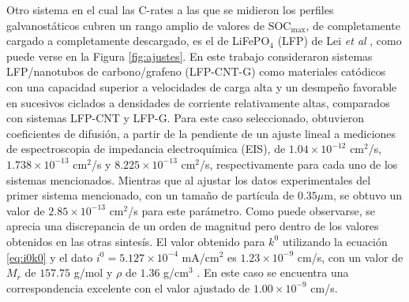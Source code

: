 Otro sistema en el cual las C-rates a las que se midieron los perfiles 
galvanostáticos cubren un rango amplio de valores de SOC$_{\max}$, de 
completamente cargado a completamente descargado, es el de LiFePO$_4$ (LFP) de 
Lei \textit{et al} \cite{lei2015}, como puede verse en la Figura 
\ref{fig:ajustes}. En este trabajo consideraron sistemas LFP/nanotubos de 
carbono/grafeno (LFP-CNT-G) como materiales catódicos con una capacidad 
superior a velocidades de carga alta y un desmpeño favorable en sucesivos 
ciclados a densidades de corriente relativamente altas, comparados con 
sistemas LFP-CNT y LFP-G. Para este caso seleccionado, obtuvieron coeficientes 
de difusión, a partir de la pendiente de un ajuste lineal a mediciones de 
espectroscopia de impedancia electroquímica (EIS), de $1.04\times10^{-12}$ 
cm$^2$/s, $1.738\times10^{-13}$ cm$^2$/s y $8.225\times10^{-13}$ cm$^2$/s, 
respectivamente para cada uno de los sistemas mencionados. Mientras que al
ajustar los datos experimentales del primer sistema mencionado, con un tamaño
de partícula de $0.35 \mu$m, se obtuvo un valor de $2.85\times10^{-13}$ cm$^2$/s
para este parámetro. Como puede observarse, se aprecia una discrepancia de un 
orden de magnitud pero dentro de los valores obtenidos en las otras sintesís.
El valor obtenido para $k^0$ utilizando la ecuación \ref{eq:i0k0} y el dato 
$i^0=5.127\times10^{-4}$ mA/cm$^2$ es $1.23\times10^{-9}$ cm/s, con un valor
de $M_r$ de $157.75$ g/mol y $\rho$ de $1.36$ g/cm$^3$ \cite{jin2018}.
En este caso se encuentra una correspondencia excelente con el valor ajustado
de $1.00\times10^{-9}$ cm/s.


